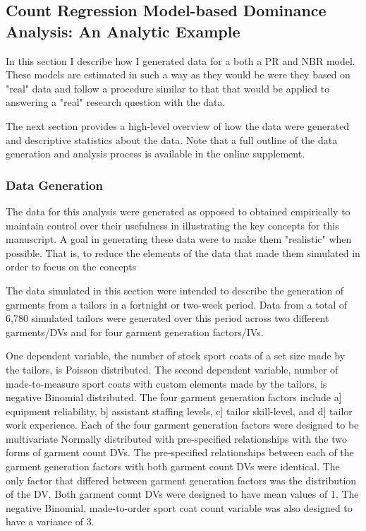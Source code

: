\documentclass[ShortAfour,times,sageapa]{sagej}
\begin{document}
	\subsection{Count Regression Model-based Dominance Analysis: An Analytic Example}
	
	In this section I describe how I generated data for a both a PR and NBR model.
	These models are estimated in such a way as they would be were they based on "real" data and follow a procedure similar to that that would be applied to answering a "real" research question with the data.
	
	The next section provides a high-level overview of how the data were generated and descriptive statistics about the data.
	Note that a full outline of the data generation and analysis process is available in the online supplement.
	
		\subsubsection{Data Generation}
		
	The data for this analysis were generated as opposed to obtained empirically to maintain control over their usefulness in illustrating the key concepts for this manuscript.
	A goal in generating these data were to make them "realistic" when possible. 
	That is, to reduce the elements of the data that made them simulated in order to focus on the concepts
	
	The data simulated in this section were intended to describe the generation of garments from a tailors in a fortnight or two-week period.
	Data from a total of 6,780 simulated tailors were generated over this period across two different garments/DVs and for four garment generation factors/IVs.
	
	One dependent variable, the number of stock sport coats of a set size made by the tailors, is Poisson distributed. 
	The second dependent variable, number of made-to-measure sport coats with custom elements made by the tailors, is negative Binomial distributed. 
	The four garment generation factors include a] equipment reliability, b] assistant staffing levels, c] tailor skill-level, and d] tailor work experience.
	Each of the four garment generation factors were designed to be multivariate Normally distributed with pre-specified relationships with the two forms of garment count DVs.
	The pre-specified relationships between each of the garment generation factors with both garment count DVs were identical.
	The only factor that differed between garment generation factors was the distribution of the DV.
	Both garment count DVs were designed to have mean values of 1.
	The negative Binomial, made-to-order sport coat count variable was also designed to have a variance of 3.	
	
\end{document}
